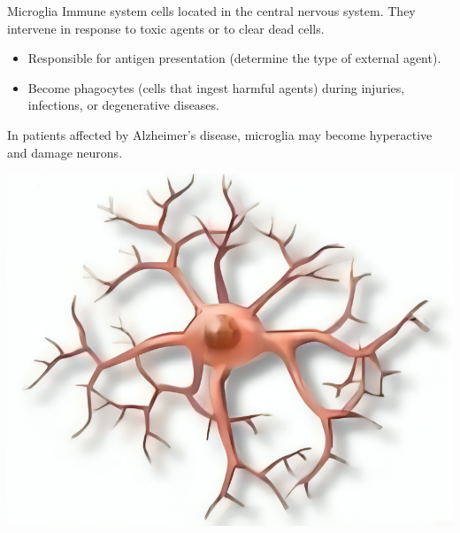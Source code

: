 \begin{minipage}{0.89\textwidth}
    \begin{descriptionlist}
        \item[Microglia] 
            Immune system cells located in the central nervous system.
            They intervene in response to toxic agents or to clear dead cells.
            \begin{itemize}
                \item Responsible for antigen presentation (determine the type of external agent).
                \item Become phagocytes (cells that ingest harmful agents) during injuries, infections, or degenerative diseases.
            \end{itemize}
    
            \begin{remark}
                In patients affected by Alzheimer's disease, microglia may become hyperactive and damage neurons.
            \end{remark}
    \end{descriptionlist}
\end{minipage}
\begin{minipage}{0.1\textwidth}
    \centering
    \includegraphics[width=\textwidth]{./img/microglia.png}
\end{minipage}\\[1em]

